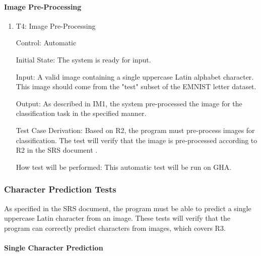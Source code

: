 \documentclass[12pt, titlepage]{article}
\begin{document}
\paragraph{Image Pre-Processing}

\begin{enumerate}

\item{T4: Image Pre-Processing\\}

Control: Automatic

Initial State: The \progname{} system is ready for input.

Input: A valid image containing a single uppercase Latin alphabet character.
This image should come from the "test" subset of the EMNIST letter dataset.

Output: As described in IM1, the system pre-processed the image for the
classification task in the specified manner.

Test Case Derivation: Based on R2, the program must pre-process images for
classification. The test will verify that the image is pre-processed according
to R2 in the SRS document \citep{SRS}.

How test will be performed: This automatic test will be run on GHA.

\end{enumerate}

\subsubsection{Character Prediction Tests}

As specified in the SRS document, the program must be able to predict a single
uppercase Latin character from an image. These tests will verify that the program
can correctly predict characters from images, which covers R3.

\paragraph{Single Character Prediction}
\end{document}
